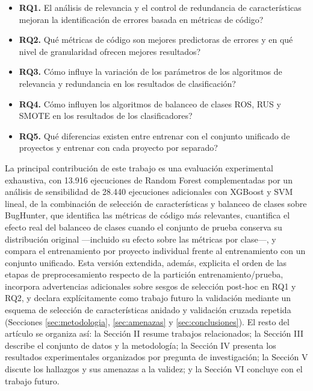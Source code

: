 \documentclass[conference,a4paper]{IEEEtran}
\begin{document}
\begin{itemize}
\item \textbf{RQ1.} \textquestiondown{}El análisis de relevancia y el control de redundancia de características mejoran la identificación de errores basada en métricas de código?
\item \textbf{RQ2.} \textquestiondown{}Qué métricas de código son mejores predictoras de errores y en qué nivel de granularidad ofrecen mejores resultados?
\item \textbf{RQ3.} \textquestiondown{}Cómo influye la variación de los parámetros de los algoritmos de relevancia y redundancia en los resultados de clasificación?
\item \textbf{RQ4.} \textquestiondown{}Cómo influyen los algoritmos de balanceo de clases ROS, RUS y SMOTE en los resultados de los clasificadores?
\item \textbf{RQ5.} \textquestiondown{}Qué diferencias existen entre entrenar con el conjunto unificado de proyectos y entrenar con cada proyecto por separado?
\end{itemize}

La principal contribución de este trabajo es una evaluación experimental exhaustiva, con 13.916 ejecuciones de Random Forest complementadas por un análisis de sensibilidad de 28.440 ejecuciones adicionales con XGBoost y SVM lineal, de la combinación de selección de características y balanceo de clases sobre BugHunter, que identifica las métricas de código más relevantes, cuantifica el efecto real del balanceo de clases cuando el conjunto de prueba conserva su distribución original ---incluido su efecto sobre las métricas por clase---, y compara el entrenamiento por proyecto individual frente al entrenamiento con un conjunto unificado. Esta versión extendida, además, explicita el orden de las etapas de preprocesamiento respecto de la partición entrenamiento/prueba, incorpora advertencias adicionales sobre sesgos de selección post-hoc en RQ1 y RQ2, y declara explícitamente como trabajo futuro la validación mediante un esquema de selección de características anidado y validación cruzada repetida (Secciones \ref{sec:metodologia}, \ref{sec:amenazas} y \ref{sec:conclusiones}). El resto del artículo se organiza así: la Sección II resume trabajos relacionados; la Sección III describe el conjunto de datos y la metodología; la Sección IV presenta los resultados experimentales organizados por pregunta de investigación; la Sección V discute los hallazgos y sus amenazas a la validez; y la Sección VI concluye con el trabajo futuro.
\end{document}
